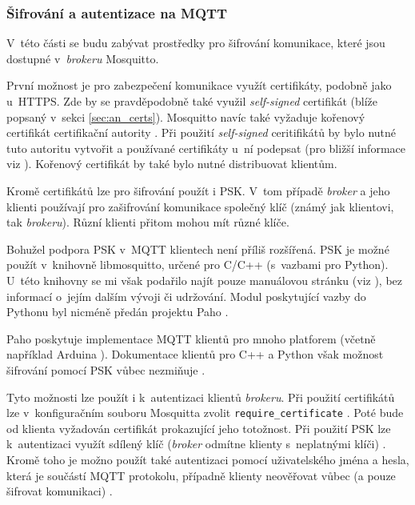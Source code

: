 \subsubsection{Šifrování a autentizace na MQTT}

V~této části se budu zabývat prostředky pro šifrování komunikace, které jsou dostupné v~\textit{brokeru} Mosquitto.

První možnost je pro zabezpečení komunikace využít certifikáty, podobně jako u~HTTPS. Zde by se pravděpodobně také využil \textit{self-signed} certifikát (blíže popsaný v~sekci \ref{sec:an_certs}). Mosquitto navíc také vyžaduje kořenový certifikát certifikační autority \cite{mqtt_mosquitto_tsl}. Při použití \textit{self-signed} ceritifikátů by bylo nutné tuto autoritu vytvořit a používané certifikáty u~ní podepsat (pro bližší informace viz \cite{ca_nguyen}). Kořenový certifikát by také bylo nutné distribuovat klientům.

Kromě certifikátů lze pro šifrování použít i PSK. V~tom případě \textit{broker} a jeho klienti používají pro zašifrování komunikace společný klíč (známý jak klientovi, tak \textit{brokeru}). Různí klienti přitom mohou mít různé klíče. \cite{mqtt_mosquitto_conf}

Bohužel podpora PSK v~MQTT klientech není příliš rozšířená. PSK je možné použít v~knihovně libmosquitto, určené pro C/C++ (s~vazbami pro Python). U~této knihovny se mi však podařilo najít pouze manuálovou stránku (viz \cite{libmosquitto_man}), bez informací o~jejím dalším vývoji či udržování. Modul poskytující vazby do Pythonu byl nicméně předán projektu Paho \cite{mosquitto_python}.

Paho poskytuje implementace MQTT klientů pro mnoho platforem (včetně například Arduina \cite{paho_embedded}). Dokumentace klientů pro C++ a Python však možnost šifrování pomocí PSK vůbec nezmiňuje \cite{paho_cpp_doc, paho_pyt_doc}.

Tyto možnosti lze použít i k~autentizaci klientů \textit{brokeru}. Při použití certifikátů lze v~konfiguračním souboru Mosquitta zvolit \verb|require_certificate| \cite{mqtt_mosquitto_conf}. Poté bude od klienta vyžadován certifikát prokazující jeho totožnost. Při použití PSK lze k~autentizaci využít sdílený klíč (\textit{broker} odmítne klienty s~neplatnými klíči) \cite{mqtt_mosquitto_conf}. Kromě toho je možno použít také autentizaci pomocí uživatelského jména a hesla, která je součástí MQTT protokolu, případně klienty neověřovat vůbec (a pouze šifrovat komunikaci) \cite{mqtt_mosquitto_conf}.

